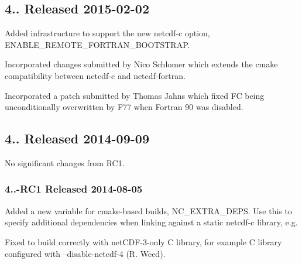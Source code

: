 \subsection*{4.. Released 2015-\/02-\/02}


\begin{DoxyItemize}
\item Added infrastructure to support the new {\ttfamily netcdf-\/c} option, {\ttfamily E\+N\+A\+B\+L\+E\+\_\+\+R\+E\+M\+O\+T\+E\+\_\+\+F\+O\+R\+T\+R\+A\+N\+\_\+\+B\+O\+O\+T\+S\+T\+R\+AP}.
\item Incorporated changes submitted by Nico Schlomer which extends the cmake compatibility between {\ttfamily netcdf-\/c} and {\ttfamily netcdf-\/fortran}.
\item Incorporated a patch submitted by Thomas Jahns which fixed {\ttfamily FC} being unconditionally overwritten by {\ttfamily F77} when {\ttfamily Fortran 90} was disabled.
\end{DoxyItemize}

\subsection*{4.. Released 2014-\/09-\/09}


\begin{DoxyItemize}
\item No significant changes from R\+C1.
\end{DoxyItemize}

\subsubsection*{4..-\/\+R\+C1 Released 2014-\/08-\/05}


\begin{DoxyItemize}
\item Added a new variable for cmake-\/based builds, {\ttfamily N\+C\+\_\+\+E\+X\+T\+R\+A\+\_\+\+D\+E\+PS}. Use this to specify additional dependencies when linking against a static {\ttfamily netcdf-\/c} library, e.\+g.
\end{DoxyItemize}





\begin{DoxyItemize}
\item Fixed to build correctly with net\+C\+D\+F-\/3-\/only C library, for example C library configured with --disable-\/netcdf-\/4 (R. Weed).
\end{DoxyItemize}

